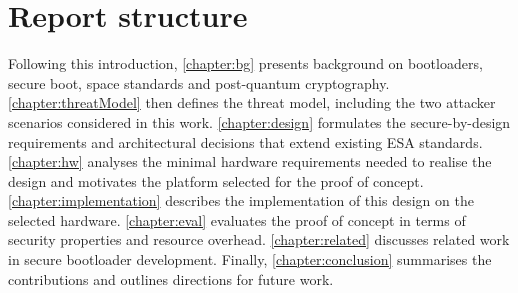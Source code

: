 \section{Report structure}
\label{section:intro-structure}

Following this introduction, \autoref{chapter:bg} presents background on bootloaders, secure boot, space standards and post-quantum cryptography. \autoref{chapter:threatModel} then defines the threat model, including the two attacker scenarios considered in this work. \autoref{chapter:design} formulates the secure-by-design requirements and architectural decisions that extend existing ESA standards. \autoref{chapter:hw} analyses the minimal hardware requirements needed to realise the design and motivates the platform selected for the proof of concept. \autoref{chapter:implementation} describes the implementation of this design on the selected hardware. \autoref{chapter:eval} evaluates the proof of concept in terms of security properties and resource overhead. \autoref{chapter:related} discusses related work in secure bootloader development. Finally, \autoref{chapter:conclusion} summarises the contributions and outlines directions for future work.